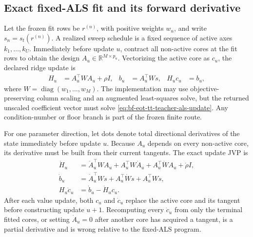 \subsection{Exact fixed-ALS fit and its forward derivative}

Let the frozen fit rows be \(r^{(n)}\), with positive weights \(w_n\), and
write \(s_n=s_t(r^{(n)})\).  A realized sweep schedule is a fixed sequence of
active axes \(k_1,\ldots,k_U\).  Immediately before update \(u\), contract all
non-active cores at the fit rows to obtain the design
\(A_u\in\mathbb R^{M\times p_u}\).  Vectorizing the active core as \(c_u\),
the declared ridge update is
\begin{align}
 H_u&=A_u^\top W A_u+\rho I,
 &b_u&=A_u^\top W s,
 &H_uc_u&=b_u,
 \label{eq:bf-eot-tt-teacher-als-update}
\end{align}
where \(W=\operatorname{diag}(w_1,\ldots,w_M)\).  The implementation may use
objective-preserving column scaling and an augmented least-squares solve, but
the returned unscaled coefficient vector must solve
\eqref{eq:bf-eot-tt-teacher-als-update}.  Any condition-number or floor branch
is part of the frozen finite route.

For one parameter direction, let dots denote total directional derivatives of
the state immediately before update \(u\).  Because \(A_u\) depends on every
non-active core, its derivative must be built from their current tangents.  The
exact update JVP is
\begin{align}
 \dot H_u
 &=\dot A_u^\top W A_u+A_u^\top W\dot A_u
   +A_u^\top\dot W A_u+\dot\rho I,\\
 \dot b_u
 &=\dot A_u^\top Ws+A_u^\top\dot W s+A_u^\top W\dot s,\\
 H_u\dot c_u
 &=\dot b_u-\dot H_uc_u.
 \label{eq:bf-eot-tt-teacher-als-jvp}
\end{align}
After each value update, both \(c_u\) and \(\dot c_u\) replace the active
core and its tangent before constructing update \(u+1\).  Recomputing every
\(\dot c_u\) from only the terminal fitted cores, or setting
\(\dot A_u=0\) after another core has acquired a tangent, is a partial
derivative and is wrong relative to the fixed-ALS program.


